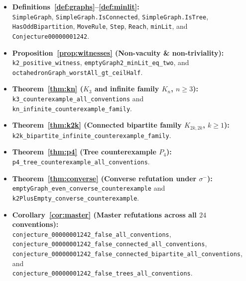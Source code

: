 \documentclass[11pt,a4paper]{article}
\theoremstyle{definition}
\begin{document}
\begin{itemize}
\item \textbf{Definitions~\ref{def:graphs}--\ref{def:minlit}:}\\
\texttt{SimpleGraph}, \texttt{SimpleGraph.IsConnected}, \texttt{SimpleGraph.IsTree},
\texttt{HasOddBipartition}, \texttt{MoveRule}, \texttt{Step}, \texttt{Reach},
\texttt{minLit}, and \texttt{Conjecture00000001242}.
\item \textbf{Proposition~\ref{prop:witnesses} (Non-vacuity \& non-triviality):}\\
\texttt{k2\_positive\_witness}, \texttt{emptyGraph2\_minLit\_eq\_two}, and\\
\texttt{octahedronGraph\_worstAll\_gt\_ceilHalf}.
\item \textbf{Theorem~\ref{thm:kn} ($K_3$ and infinite family $K_n$, $n \ge 3$):}\\
\texttt{k3\_counterexample\_all\_conventions} and
\texttt{kn\_infinite\_counterexample\_family}.
\item \textbf{Theorem~\ref{thm:k2k} (Connected bipartite family $K_{2k,2k}$, $k \ge 1$):}\\
\texttt{k2k\_bipartite\_infinite\_counterexample\_family}.
\item \textbf{Theorem~\ref{thm:p4} (Tree counterexample $P_4$):}\\
\texttt{p4\_tree\_counterexample\_all\_conventions}.
\item \textbf{Theorem~\ref{thm:converse} (Converse refutation under $\sigma^-$):}\\
\texttt{emptyGraph\_even\_converse\_counterexample} and\\
\texttt{k2PlusEmpty\_converse\_counterexample}.
\item \textbf{Corollary~\ref{cor:master} (Master refutations across all $24$ conventions):}\\
\texttt{conjecture\_00000001242\_false\_all\_conventions},\\
\texttt{conjecture\_00000001242\_false\_connected\_all\_conventions},\\
\texttt{conjecture\_00000001242\_false\_connected\_bipartite\_all\_conventions}, and\\
\texttt{conjecture\_00000001242\_false\_trees\_all\_conventions}.
\end{itemize}
\end{document}
